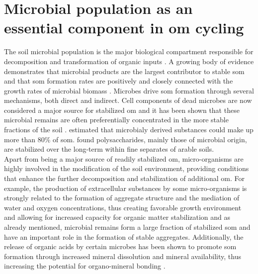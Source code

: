\section{Microbial population as an essential component in \gls{om} cycling}

  	The soil microbial population is the major biological compartment responsible for decomposition and transformation of organic inputs \citep{thiet2006}. A growing body of evidence demonstrates that microbial products are the largest contributor to stable \gls{som} and that \gls{som} formation rates are positively and closely connected with the growth rates of microbial biomass \citep{kallenbach2016, kallenbach2015, ludwig2015, schurig2013, bradford2013}. Microbes drive \gls{som} formation through several mechanisms, both direct and indirect. Cell components of dead microbes are now considered a major source for stabilized \gls{om} \citep{kallenbach2015, liang2011, miltner2009} and it has been shown that these microbial remains are often preferentially concentrated in the more stable fractions of the soil \citep{ludwig2015}. \citet{liang2011} estimated that microbialy derived substances could make up more than 80\% of \gls{som}⁠.
  	\citet{kiem2003} found polysaccharides, mainly those of microbial origin, are stabilized over the long-term within fine separates of arable soils.\\
  	Apart from being a major source of readily stabilized \gls{om}, micro-organisms are highly involved in the  modification of the soil environment, providing conditions that enhance the further decomposition and stabilization of additional \gls{om}.  For example, the production of extracellular substances by some micro-organisms is strongly related to the formation of aggregate structure and the mediation of water and oxygen concentrations, thus creating favorable growth environment and allowing for increased capacity for organic matter stabilization \citep{schimel2012} ⁠and as already mentioned, microbial remains form a large fraction of stabilized \gls{som} and have an important role in the formation of stable aggregates. Additionally, the release of organic acids by certain microbes has been shown to promote \gls{som} formation through increased mineral dissolution and mineral availability, thus increasing the potential for organo-mineral bonding \citep{yu2018}.



